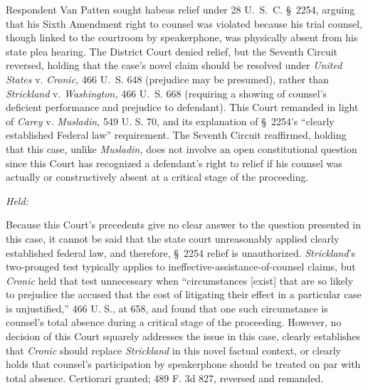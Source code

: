 
\setcounter{page}{120}

  Respondent Van Patten sought habeas relief under 28 U.~S.~C. \S~2254, arguing that his Sixth Amendment right to counsel was violated because his trial counsel, though linked to the courtroom by speakerphone, was physically absent from his state plea hearing. The District Court denied relief, but the Seventh Circuit reversed, holding that the case's novel claim should be resolved under \emph{United States} v. \emph{Cronic,} 466 U.~S. 648 (prejudice may be presumed), rather than \emph{Strickland} v. \emph{Washington,} 466 U.~S. 668 (requiring a showing of counsel's deficient performance and prejudice to defendant). This Court remanded in light of \emph{Carey} v. \emph{Musladin,} 549 U. S. 70, and its explanation of \S~2254's ``clearly established Federal law'' requirement. The Seventh Circuit reaffirmed, holding that this case, unlike \emph{Musladin,} does not involve an open constitutional question since this Court has recognized a defendant's right to relief if his counsel was actually or constructively absent at a critical stage of the proceeding.

\emph{Held:}

  Because this Court's precedents give no clear answer to the question presented in this case, it cannot be said that the state court unreasonably applied clearly established federal law, and therefore, \S~2254 relief is unauthorized. \emph{Strickland}'s two-pronged test typically applies to ineffective-assistance-of-counsel claims, but \emph{Cronic} held that test unnecessary when ``circumstances [exist] that are so likely to prejudice the accused that the cost of litigating their effect in a particular case is unjustified,'' 466 U. S., at 658, and found that one such circumstance is counsel's total absence during a critical stage of the proceeding. However, no decision of this Court squarely addresses the issue in this case, clearly establishes that \emph{Cronic} should replace \emph{Strickland} in this novel factual context, or clearly holds that counsel's participation by speakerphone should be treated on par with total absence. Certiorari granted; 489 F. 3d 827, reversed and remanded.
